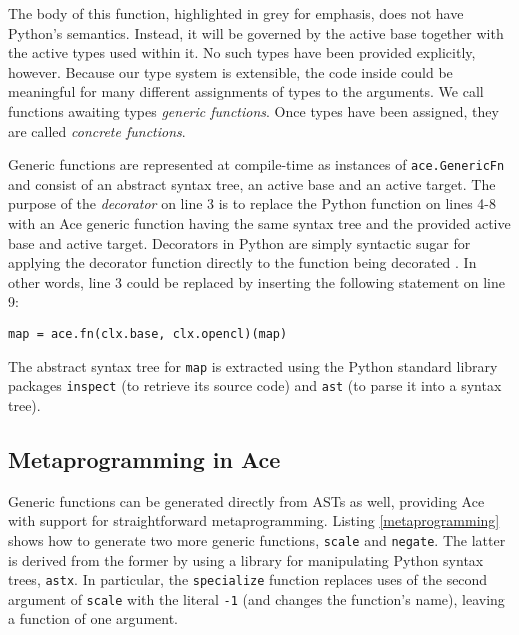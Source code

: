 \documentclass[9pt,preprint]{sigplanconf}
\begin{document}
The body of this function, highlighted in grey for emphasis, does not have Python's semantics. Instead, it will be governed by the active base together with the active types used within it. No such types have been provided explicitly, however. Because our type system is extensible, the code inside could be meaningful for many different assignments of types to the arguments. We call functions awaiting types \emph{generic functions}. Once types have been assigned, they are called \emph{concrete functions}.

Generic functions are represented at compile-time as instances of \verb|ace.GenericFn| and consist of an abstract syntax tree, an {active base} and an {active target}. The purpose of the \emph{decorator} on line 3 is to replace the Python function on lines 4-8 with an Ace generic function having the same syntax tree and the provided active base and active target. 
Decorators in Python are simply syntactic sugar for applying the decorator function directly to the function  being decorated \cite{python}. In other words, line 3 could be replaced by inserting the following  statement on line 9:

\verb|map = ace.fn(clx.base, clx.opencl)(map)| 

The abstract syntax tree for \verb|map| is extracted using the Python standard  library packages  \verb|inspect| (to retrieve its source code) and \verb|ast| (to parse it into a syntax tree). 

\subsection{Metaprogramming in Ace}
Generic functions can be generated directly from ASTs as well, providing Ace with support for  straightforward metaprogramming. Listing \ref{metaprogramming} shows how to generate two more generic functions, \verb|scale| and \verb|negate|. The latter is derived from the former by using a library for manipulating Python syntax trees, \verb|astx|. In particular, the \verb|specialize| function replaces uses of the second argument of \verb|scale| with the literal \verb|-1| (and changes the function's name), leaving a function of one argument.
 
\end{document}
